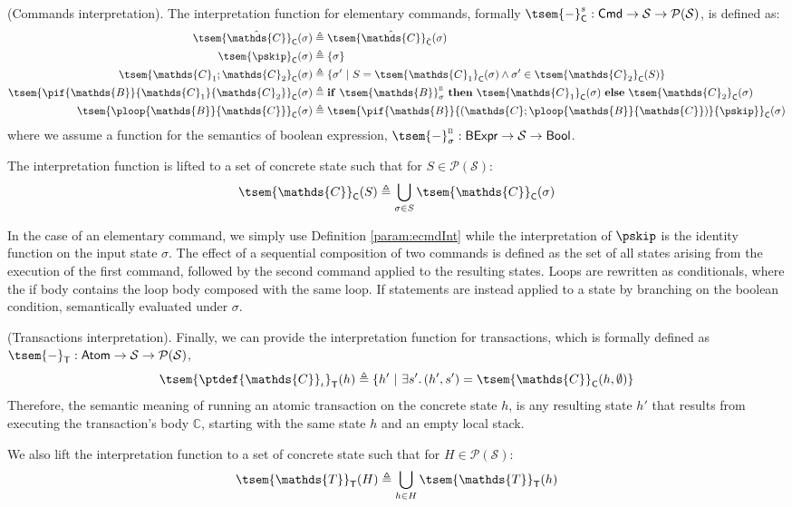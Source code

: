 \begin{defn}
	(Commands interpretation).
	The interpretation function for elementary commands, formally $\tsem{-}^s_{\mathsf{C}} : \mathsf{Cmd} \rightarrow \mathcal{S} \rightarrow \mathcal{P}(\mathcal{S})$, is defined as:
	\begin{align*}
		\tsem{\hat{\mathds{C}}}_{\mathsf{C}}(\sigma) &\triangleq \tsem{\hat{\mathds{C}}}_{\hat{\mathsf{C}}}(\sigma)
		\\
		\tsem{\pskip}_{\mathsf{C}}(\sigma) &\triangleq \{ \sigma \}
		\\
		\tsem{\mathds{C}_1 ; \mathds{C}_2}_{\mathsf{C}}(\sigma) &\triangleq \{ \sigma'\ |\ S = \tsem{\mathds{C}_1}_\mathsf{C}(\sigma) \land \sigma' \in \tsem{\mathds{C}_2}_\mathsf{C}(S) \}
		\\
		\tsem{\pif{\mathds{B}}{\mathds{C}_1}{\mathds{C}_2}}_\mathsf{C}(\sigma) &\triangleq \mathbf{if}\ \tsem{\mathds{B}}^\textsc{b}_\sigma\ \mathbf{then}\ \tsem{\mathds{C}_1}_\mathsf{C}(\sigma)\ \mathbf{else}\ \tsem{\mathds{C}_2}_\mathsf{C}(\sigma)
		\\
		\tsem{\ploop{\mathds{B}}{\mathds{C}}}_\mathsf{C}(\sigma) &\triangleq \tsem{\pif{\mathds{B}}{\left(\mathds{C};\ploop{\mathds{B}}{\mathds{C}}\right)}{\pskip}}_\mathsf{C}(\sigma)
	\end{align*}
	where we assume a function for the semantics of boolean expression, $\tsem{-}^\textsc{b}_\sigma : \mathsf{BExpr} \rightarrow \mathcal{S} \rightarrow \mathsf{Bool}$.
	
	The interpretation function is lifted to a set of concrete state such that for $S \in \mathcal{P}(\mathcal{S})$:
	\[
		\tsem{\mathds{C}}_\mathsf{C}(S) \triangleq \bigcup_{\sigma \in S} \tsem{\mathds{C}}_\mathsf{C}(\sigma)
	\]	
\end{defn}
In the case of an elementary command, we simply use Definition \ref{param:ecmdInt} while the interpretation of $\pskip$ is the identity function on the input state $\sigma$. The effect of a sequential composition of two commands is defined as the set of all states arising from the execution of the first command, followed by the second command applied to the resulting states. Loops are rewritten as conditionals, where the if body contains the loop body composed with the same loop. If statements are instead applied to a state by branching on the boolean condition, semantically evaluated under $\sigma$.

 (Transactions interpretation). Finally, we can provide the interpretation function for transactions, which is formally defined as $\tsem{-}_\mathsf{T} : \mathsf{Atom} \rightarrow \mathcal{S} \rightarrow \mathcal{P}(\mathcal{S})$,
\[
	\tsem{\ptdef{\mathds{C}}_\iota}_\mathsf{T}(h) \triangleq \{ h'\ |\ \exists s' \ldotp (h', s') = \tsem{\mathds{C}}_\mathsf{C}(h, \emptyset) \}
\]
Therefore, the semantic meaning of running an atomic transaction on the concrete state $h$, is any resulting state $h'$ that results from executing the transaction's body $\mathds{C}$, starting with the same state $h$ and an empty local stack.

We also lift the interpretation function to a set of concrete state such that for $H \in \mathcal{P}(\mathcal{S})$:
\[
	\tsem{\mathds{T}}_\mathsf{T}(H) \triangleq \bigcup_{h \in H}  \tsem{\mathds{T}}_\mathsf{T}(h)
\]	